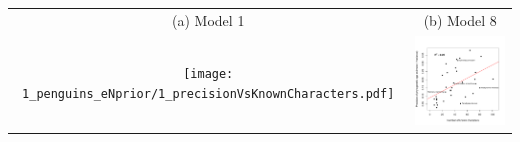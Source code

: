 \documentclass{standalone}
\begin{document}
\begin{tabular}{cc}
(a) Model 1 & (b) Model 8 \\
\texttt{[image: 1\_penguins\_eNprior/1\_precisionVsKnownCharacters.pdf]} 
& 
\includegraphics[width=6.5cm]{8_penguins_eNprior/8_precisionVsKnownCharacters.pdf}
\\
\end{tabular}
\end{document}
